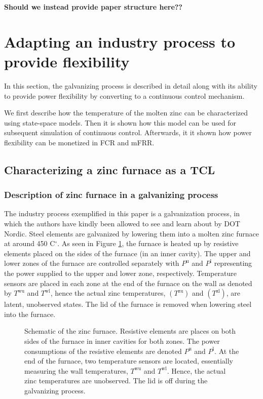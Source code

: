 \documentclass[lettersize,journal]{IEEEtran}
\begin{document}
\textbf{Should we instead provide paper structure here??}

\section{Adapting an industry process to provide flexibility}\label{sec:zinc_furnace_description}

In this section, the galvanizing process is described in detail along with its ability to provide power flexibility by converting to a continuous control mechanism.

We first describe how the temperature of the molten zinc can be characterized using state-space models. Then it is shown how this model can be used for subsequent simulation of continuous control. Afterwards, it it shown how power flexibility can be monetized in FCR and mFRR.

\subsection{Characterizing a zinc furnace as a TCL}



\subsubsection{Description of zinc furnace in a galvanizing process}

The industry process exemplified in this paper is a galvanization process, in which the authors have kindly been allowed to see and learn about by DOT Nordic. Steel elements are galvanized by lowering them into a molten zinc furnace at around 450 C$^{\circ}$. As seen in Figure \ref{fig:furnace_schematic_tikz}, the furnace is heated up by resistive elements placed on the sides of the furnace (in an inner cavity). The upper and lower zones of the furnace are controlled separately with $P^{\text{u}}$ and $P^{\text{l}}$ representing the power supplied to the upper and lower zone, respectively. Temperature sensors are placed in each zone at the end of the furnace on the wall as denoted by $T^{\text{wu}}$ and $T^{\text{wl}}$, hence the actual zinc temperatures, $(T^{\text{zu}})$ and $(T^{\text{zl}})$, are latent, unobserved states. The lid of the furnace is removed when lowering steel into the furnace.

\begin{figure}[!t]
    \centering
    
    \caption{Schematic of the zinc furnace. Resistive elements are places on both sides of the furnace in inner cavities for both zones. The power consumptions of the resistive elements are denoted $P^{\text{u}}$ and $P^{\text{l}}$. At the end of the furnace, two temperature sensors are located, essentially measuring the wall temperatures, $T^{\text{wu}}$ and $T^{\text{wl}}$. Hence, the actual zinc temperatures are unobserved. The lid is off during the galvanizing process.}
    \label{fig:furnace_schematic_tikz}
\end{figure}
\end{document}
